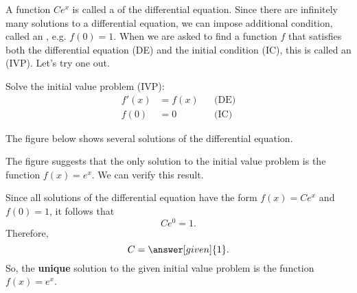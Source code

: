 \documentclass{ximera}
\begin{document}
A function $Ce^x$ is called a  of the differential equation. Since there are infinitely many solutions to a differential equation, we can impose additional condition, called an , e.g. $f(0)=1$. When we are asked to find a function $f$ that satisfies both the differential equation (DE) and the initial condition (IC), this is called an  (IVP). Let's try one out.
\begin{example}
Solve the initial value problem (IVP):
\begin{align*}
	f'(x) & = f(x) && \text{(DE)}  \\
	f(0) & = 0 && \text{(IC)} 
\end{align*}
\begin{explanation}
The figure below shows several solutions of the differential equation. 
\begin{image}
\end{image}
The figure suggests that the only solution to the initial value problem is the function $f(x)=e^x$.
We can verify this result.

Since all solutions of the differential equation have the form $f(x)=Ce^x$ and $f(0)=1$, it follows that 
\[
Ce^0 = 1.
\]
Therefore,
\[
C = \answer[given]{1}.
\]
So, the \textbf{unique} solution to the given initial value problem is the function $f(x)=e^x$.
\end{explanation}
\end{example}
\end{document}
